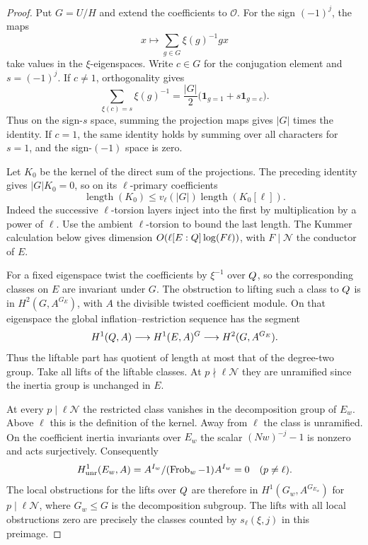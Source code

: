 \begin{proof}

Put \(G=U/H\) and extend the
coefficients to \(\mathcal O\). For the sign \((-1)^j\),
the maps
\[
                x\longmapsto \sum_{g\in G}\xi(g)^{-1}gx
\]
take values in the \(\xi\)-eigenspaces. Write \(c\in G\) for the conjugation element and
\(s=(-1)^j\). If \(c\ne1\), orthogonality gives
\[
 \sum_{\xi(c)=s}\xi(g)^{-1}
   = \frac{|G|}{2}\bigl(\mathbf1_{g=1}
                              +s\mathbf1_{g=c}\bigr).
\]
Thus on the sign-\(s\) space, summing the projection maps
gives \(|G|\) times the identity. If \(c=1\), the same
identity holds by summing over all characters for \(s=1\),
and the sign-\((-1)\) space is zero.

Let \(K_0\) be the kernel of the direct sum of the projections.
The preceding identity gives \(|G|K_0=0\), so on its \(\ell\)-primary
coefficients
\[
 \operatorname{length}(K_0)\le v_\ell(|G|)
                  \operatorname{length}(K_0[\ell]).
\]
Indeed the successive \(\ell\)-torsion layers inject into the first by
multiplication by a power of \(\ell\). Use the ambient \(\ell\)-torsion
to bound the last length. The Kummer calculation below gives
dimension \(O(\ell [E:Q]\log(F\ell))\), with \(F\mid\mathcal N\)
the conductor of \(E\).


For a fixed eigenspace twist the coefficients by \(\xi^{-1}\)
over \(Q\), so the corresponding classes on \(E\) are
invariant under \(G\). The obstruction to lifting such a class
to \(Q\) is in \(H^2(G,A^{G_E})\), with \(A\) the divisible
twisted coefficient module. On that eigenspace the global inflation--restriction
sequence has the segment
\[
 H^1(Q,A)\longrightarrow H^1(E,A)^G
                       \longrightarrow H^2(G,A^{G_E}).
\]
Thus the liftable part has quotient of length at most that of
the degree-two group. Take all lifts of the liftable classes.
At \(p\nmid\ell\mathcal N\) they are unramified since the
inertia group is unchanged in \(E\).

At every
\(p\mid\ell\mathcal N\) the restricted class vanishes in
the decomposition group of \(E_w\). Above \(\ell\) this is
the definition of the kernel. Away from \(\ell\) the class is unramified. On the coefficient
inertia invariants over \(E_w\) the scalar \((Nw)^{-j}-1\) is
nonzero and acts surjectively. Consequently
\[
       H^1_{\rm unr}(E_w,A)=A^{I_w}/(\operatorname{Frob}_w-1)A^{I_w}=0
         \quad (p\ne\ell).
\] The local
obstructions for the lifts over \(Q\) are therefore in
\(H^1(G_w,A^{G_{E_w}})\) for \(p\mid\ell\mathcal N\),
where \(G_w\le G\) is the decomposition subgroup.
The lifts with all local obstructions zero are precisely
the classes counted by \(s_\ell(\xi,j)\) in this preimage.


\end{proof}
